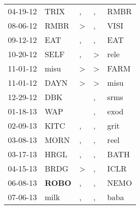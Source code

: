 \begin{supertabular}{p{0.07\textwidth}p{0.06\textwidth}p{0.02\textwidth}p{0.02\textwidth}p{0.06\textwidth}}
          04-19-12\textsuperscript{} &           TRIX\textsuperscript{} &                , &                , &           RMBR\textsuperscript{} \\
          08-06-12\textsuperscript{} &           RMBR\textsuperscript{} &     \textgreater &                , &           VISI\textsuperscript{} \\
          09-12-12\textsuperscript{} &            EAT\textsuperscript{} &                , &                , &            EAT\textsuperscript{} \\
          10-20-12\textsuperscript{} &           SELF\textsuperscript{} &                , &     \textgreater &           rele\textsuperscript{} \\
          11-01-12\textsuperscript{} &           misu\textsuperscript{} &     \textgreater &     \textgreater &           FARM\textsuperscript{} \\
          11-01-12\textsuperscript{} &           DAYN\textsuperscript{} &     \textgreater &     \textgreater &           misu\textsuperscript{} \\
          12-29-12\textsuperscript{} &            DBK\textsuperscript{} &                  &                , &           srms\textsuperscript{} \\
          01-18-13\textsuperscript{} &            WAP\textsuperscript{} &                  &                , &           exod\textsuperscript{} \\
          02-09-13\textsuperscript{} &           KITC\textsuperscript{} &                , &                , &           grit\textsuperscript{} \\
          03-08-13\textsuperscript{} &           MORN\textsuperscript{} &                , &                , &           reel\textsuperscript{} \\
          03-17-13\textsuperscript{} &           HRGL\textsuperscript{} &                , &                , &           BATH\textsuperscript{} \\
          04-15-13\textsuperscript{} &           BRDG\textsuperscript{} &     \textgreater &                , &           ICLR\textsuperscript{} \\
          06-08-13\textsuperscript{} &  \textbf{ROBO\textsuperscript{}} &                , &                , &           NEMO\textsuperscript{} \\
          07-06-13\textsuperscript{} &           milk\textsuperscript{} &                , &                , &           baba\textsuperscript{} \\

\end{supertabular}
